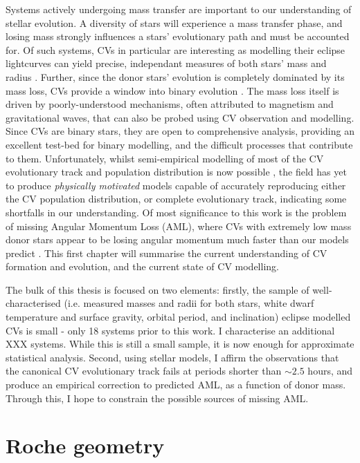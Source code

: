 Systems actively undergoing mass transfer are important to our understanding of stellar evolution. A diversity of stars will experience a mass transfer phase, and losing mass strongly influences a stars' evolutionary path and must be accounted for. Of such systems, CVs in particular are interesting as modelling their eclipse lightcurves can yield precise, independant measures of both stars' mass and radius \citep{wood1986, Littlefair2008, Savoury2011}. Further, since the donor stars' evolution is completely dominated by its mass loss, CVs provide a window into binary evolution \citep{knigge2006}. The mass loss itself is driven by poorly-understood mechanisms, often attributed to magnetism and gravitational waves, that can also be probed using CV observation and modelling.
Since CVs are binary stars, they are open to comprehensive analysis, providing an excellent test-bed for binary modelling, and the difficult processes that contribute to them. Unfortunately, whilst semi-empirical modelling of most of the CV evolutionary track and population distribution is now possible \citep{Savoury2011,knigge11,Paxton_2015}, the field has yet to produce {\it physically motivated} models capable of accurately reproducing either the CV population distribution, or complete evolutionary track, indicating some shortfalls in our understanding. Of most significance to this work is the problem of missing Angular Momentum Loss (AML), where CVs with extremely low mass donor stars appear to be losing angular momentum much faster than our models predict \citep{wild2021}. This first chapter will summarise the current understanding of CV formation and evolution, and the current state of CV modelling. 

The bulk of this thesis is focused on two elements: firstly, the sample of well-characterised (i.e. measured masses and radii for both stars, white dwarf temperature and surface gravity, orbital period, and inclination) eclipse modelled CVs is small - only 18 systems prior to this work. I characterise an additional XXX systems. While this is still a small sample, it is now enough for approximate statistical analysis. Second, using stellar models, I affirm the observations \citep{knigge2006,knigge11} that the canonical CV evolutionary track fails at periods shorter than $\sim 2.5$ hours, and produce an empirical correction to predicted AML, as a function of donor mass. Through this, I hope to constrain the possible sources of missing AML. 

\section{Roche geometry}
\label{sect:introduction:Roche geometry}

